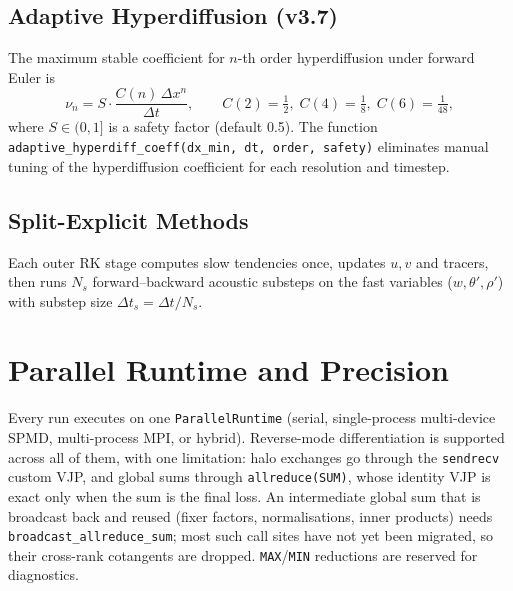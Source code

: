 \documentclass[11pt,a4paper]{article}
\begin{document}
\subsection{Adaptive Hyperdiffusion (v3.7)}

The maximum stable coefficient for $n$-th order hyperdiffusion under forward Euler is
\begin{equation}
  \nu_n = S\cdot\frac{C(n)\,\Delta x^n}{\Delta t},
  \qquad
  C(2)=\tfrac{1}{2},\;C(4)=\tfrac{1}{8},\;C(6)=\tfrac{1}{48},
\end{equation}
where $S\in(0,1]$ is a safety factor (default 0.5).  The function \texttt{adaptive\_hyperdiff\_coeff(dx\_min, dt, order, safety)} eliminates manual tuning of the hyperdiffusion coefficient for each resolution and timestep.

\subsection{Split-Explicit Methods}

Each outer RK stage computes slow tendencies once, updates $u,v$ and tracers, then runs $N_s$ forward--backward acoustic substeps on the fast variables ($w,\theta',\rho'$) with substep size $\Delta t_s=\Delta t/N_s$.

\section{Parallel Runtime and Precision}
\label{sec:parallel}

Every run executes on one \texttt{ParallelRuntime} (serial, single-process multi-device SPMD, multi-process MPI, or hybrid).  Reverse-mode differentiation is supported across all of them, with one limitation: halo exchanges go through the \texttt{sendrecv} custom VJP, and global sums through \texttt{allreduce(SUM)}, whose identity VJP is exact only when the sum is the final loss.  An intermediate global sum that is broadcast back and reused (fixer factors, normalisations, inner products) needs \texttt{broadcast\_allreduce\_sum}; most such call sites have not yet been migrated, so their cross-rank cotangents are dropped.  \texttt{MAX}/\texttt{MIN} reductions are reserved for diagnostics.
\end{document}
